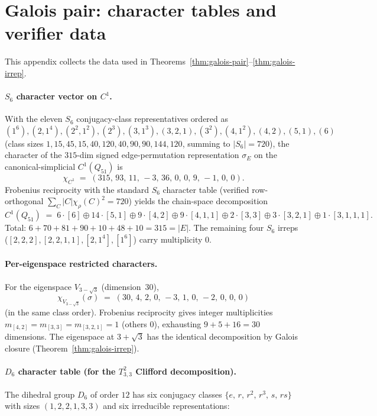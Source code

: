 \documentclass[12pt,a4paper]{article}
\theoremstyle{definition}
\theoremstyle{remark}
\begin{document}
\section{Galois pair: character tables and verifier data}\label{app:galois-tables}

This appendix collects the data used in
Theorems~\ref{thm:galois-pair}--\ref{thm:galois-irrep}.

\paragraph{$S_6$ character vector on $C^1$.}
With the eleven $S_6$ conjugacy-class representatives ordered as
$(1^6),(2,1^4),(2^2,1^2),(2^3),(3,1^3),(3,2,1),(3^2),(4,1^2),(4,2),(5,1),(6)$
(class sizes $1, 15, 45, 15, 40, 120, 40, 90, 90, 144, 120$,
summing to $|S_6| = 720$), the character of the $315$-dim signed
edge-permutation representation $\sigma_E$ on the
canonical-simplicial $C^1(Q_{51})$ is
\[
  \chi_{C^1} \;=\;
  (315,\, 93,\, 11,\, -3,\, 36,\, 0,\, 0,\, 9,\, -1,\, 0,\, 0).
\]
Frobenius reciprocity with the standard $S_6$ character table
(verified row-orthogonal $\sum_C |C|\chi_\rho(C)^2 = 720$) yields the
chain-space decomposition
\[
  C^1(Q_{51}) \;=\;
  6\cdot[6] \oplus 14\cdot[5,1] \oplus 9\cdot[4,2] \oplus 9\cdot[4,1,1]
  \oplus 2\cdot[3,3] \oplus 3\cdot[3,2,1] \oplus 1\cdot[3,1,1,1].
\]
Total: $6 + 70 + 81 + 90 + 10 + 48 + 10 = 315 = |E|$. The remaining
four $S_6$ irreps ($[2,2,2], [2,2,1,1], [2,1^4], [1^6]$) carry
multiplicity $0$.

\paragraph{Per-eigenspace restricted characters.}
For the eigenspace $V_{3-\sqrt 3}$ (dimension~$30$),
\[
  \chi_{V_{3-\sqrt 3}}(\sigma) \;=\;
  (30,\, 4,\, 2,\, 0,\, -3,\, 1,\, 0,\, -2,\, 0,\, 0,\, 0)
\]
(in the same class order). Frobenius reciprocity gives integer
multiplicities $m_{[4,2]} = m_{[3,3]} = m_{[3,2,1]} = 1$ (others $0$),
exhausting $9 + 5 + 16 = 30$ dimensions. The eigenspace at
$3 + \sqrt 3$ has the identical decomposition by Galois closure
(Theorem~\ref{thm:galois-irrep}).

\paragraph{$D_6$ character table (for the $T^2_{3,3}$ Clifford
decomposition).}
The dihedral group $D_6$ of order $12$ has six conjugacy classes
$\{e,\, r,\, r^2,\, r^3,\, s,\, rs\}$ with sizes $(1, 2, 2, 1, 3, 3)$
and six irreducible representations:
\end{document}
